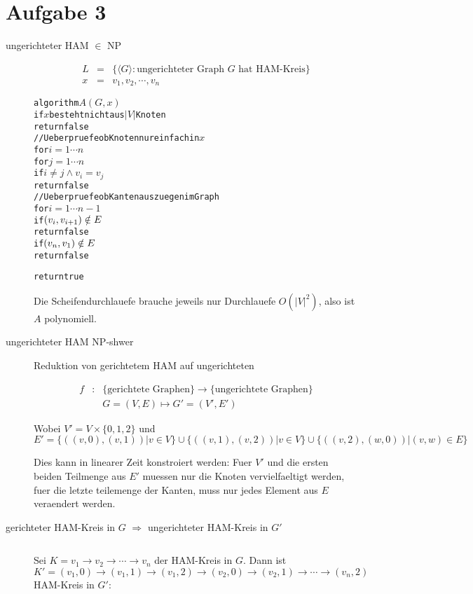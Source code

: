 \section*{Aufgabe 3}
\begin{description}
\item[ungerichteter HAM $\in$ NP]

\begin{eqnarray}
L &=& \{ \langle G \rangle: \text{ungerichteter Graph $G$ hat HAM-Kreis} \}  \\
x &=& v_1,v_2,\cdots,v_n
\end{eqnarray}

\begin{alltt}
algorithm \(A(G,x)\)
    if \(x\) besteht nicht aus \(|V|\) Knoten
        return false
    // Ueberpruefe ob Knoten nur einfach in \(x\) 
    for \(i = 1 \cdots n\)
        for \(j = 1 \cdots n\)
            if \(i\neq j \land v_i = v_j\)
                return false
    // Ueberpruefe ob Kanten aus zuegen im Graph
    for \(i = 1 \cdots n-1\)
        if \((v\sb{i},v\sb{i+1}) \notin E\)
            return false
    if \((v\sb{n},v\sb{1}) \notin E\)
        return false

    return true
\end{alltt}

Die Scheifendurchlauefe brauche jeweils nur Durchlauefe $O(|V|^2)$,
also ist $A$ polynomiell.


\item[ungerichteter HAM NP-shwer] Reduktion von gerichtetem HAM auf ungerichteten

\begin{eqnarray}
f &:& \{\text{gerichtete Graphen}\} \to \{\text{ungerichtete Graphen}\} \\
  && G=(V,E) \mapsto G'=(V',E')
\end{eqnarray}

Wobei $V' = V\times \{0,1,2\}$ und 
$E' = \{ ( (v,0), (v,1) ) | v \in V \} \cup
      \{ ( (v,1), (v,2) ) | v \in V \} \cup 
      \{ ( (v,2), (w,0) ) | (v,w) \in E \}$

Dies kann in linearer Zeit konstroiert werden: Fuer $V'$ und die ersten beiden Teilmenge aus $E'$
muessen nur die Knoten vervielfaeltigt werden, fuer die letzte teilemenge der Kanten, muss 
nur jedes Element aus $E$ veraendert werden.

\item[gerichteter HAM-Kreis in $G$ $\Rightarrow$ ungerichteter HAM-Kreis in $G'$] $ $

Sei $K = v_1 \to v_2 \to \cdots \to v_n$ der HAM-Kreis in $G$.
Dann ist $K' = (v_1,0) \to (v_1,1) \to (v_1,2) \to (v_2, 0) \to (v_2, 1) \to \cdots \to (v_n,2)$
HAM-Kreis in $G'$:


\end{description}
